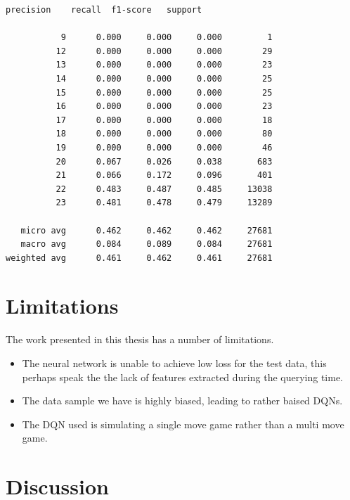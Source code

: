 \begin{lstlisting}[caption=Statistics for various orderings]
             precision    recall  f1-score   support

           9      0.000     0.000     0.000         1
          12      0.000     0.000     0.000        29
          13      0.000     0.000     0.000        23
          14      0.000     0.000     0.000        25
          15      0.000     0.000     0.000        25
          16      0.000     0.000     0.000        23
          17      0.000     0.000     0.000        18
          18      0.000     0.000     0.000        80
          19      0.000     0.000     0.000        46
          20      0.067     0.026     0.038       683
          21      0.066     0.172     0.096       401
          22      0.483     0.487     0.485     13038
          23      0.481     0.478     0.479     13289

   micro avg      0.462     0.462     0.462     27681
   macro avg      0.084     0.089     0.084     27681
weighted avg      0.461     0.462     0.461     27681
\end{lstlisting}
\section{Limitations}
The work presented in this thesis has a number of limitations.
\begin{itemize}
    \item The neural network is unable to achieve low loss for the test data, this perhaps speak the the lack of features extracted during the querying time.
    \item The data sample we have is highly biased, leading to rather baised DQNs.
    \item The DQN used is simulating a single move game rather than a multi move game.
\end{itemize}

\section{Discussion}

